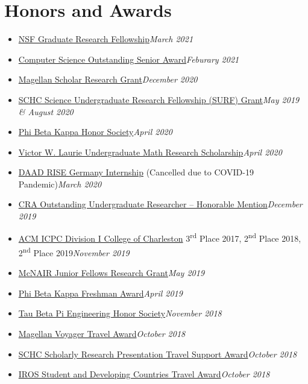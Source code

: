 \documentclass[\ifdefined\cv10pt\else11pt\fi,letterpaper]{moderncv}
\newcommand{\cvonly}[1]{\ifdefined\cv#1\fi\ignorespaces}
\renewcommand{\cvitem}[2]{\item {#1}\hfill\textit{#2}}
\newcommand{\nd}{\textsuperscript{nd}\xspace}
\newcommand{\rd}{\textsuperscript{rd}\xspace}
\let\oldsection\section
\renewcommand{\section}[1]{\vspace*{-1.3ex}\oldsection{#1}\vspace*{-0.5ex}}
\begin{document}
\section{Honors and Awards}
\begin{itemize}
	\cvitem{\href{https://www.research.gov/grfp/Login.do}{NSF Graduate Research Fellowship}}{March 2021}  %
	\cvitem{\href{https://cse.sc.edu/news/outstanding-senior-award-2021}{Computer Science Outstanding Senior Award}}{Feburary 2021}  %
	\cvitem{\href{https://sc.edu/about/offices_and_divisions/undergraduate_research/apply_for_funding/our_funding/magellan-scholar-award/index.php}{Magellan Scholar Research Grant}}{December 2020}
	\cvitem{\href{https://www.sc.edu/study/colleges_schools/honors_college/internal/beyond_the_classroom/undergraduate_research/surf_and_exploration_grants/index.php}{SCHC Science Undergraduate Research Fellowship (SURF) Grant}}{May 2019 \& August 2020}
	\cvitem{\href{https://www.pbk.org/}{Phi Beta Kappa Honor Society}}{April 2020}
	\cvitem{\href{https://sc.edu/study/colleges_schools/artsandsciences/mathematics/study/awards_scholarships/}{Victor W. Laurie Undergraduate Math Research Scholarship}}{April 2020}
	\cvitem{\href{https://www.daad.de/rise/en/rise-germany/}{DAAD RISE Germany Internship} (Cancelled due to COVID-19 Pandemic)}{March 2020}
	\cvitem{\href{https://cra.org/about/awards/outstanding-undergraduate-researcher-award/}{CRA Outstanding Undergraduate Researcher -- Honorable Mention}}{December 2019}  %
	\cvonly{\cvitem{\href{http://compsci.cofc.edu/ACM-ICPC.php}{ACM ICPC Division I College of Charleston} 3\rd Place 2017, 2\nd Place 2018, 2\nd Place 2019}{November 2019}}
	\cvitem{\href{https://sc.edu/about/offices_and_divisions/undergraduate_research/apply_for_funding/other_money_opportunities/cec_mcnair-research-fellows-summer/index.php}{McNAIR Junior Fellows Research Grant}}{May 2019}  %
	\cvitem{\href{https://www.sc.edu/uofsc/announcements/posts/2019/04/university_awards_day_2019.php}{Phi Beta Kappa Freshman Award}}{April 2019}
	\cvitem{\href{https://tbp.org/}{Tau Beta Pi Engineering Honor Society}}{November 2018}
	\cvonly{
	\cvitem{\href{https://www.sc.edu/about/offices_and_divisions/undergraduate_research/apply_for_funding/our_funding/conference-travel/index.php}{Magellan Voyager Travel Award}}{October 2018}
	\cvitem{\href{https://www.sc.edu/study/colleges_schools/honors_college/experience/undergraduate_research/index.php}{SCHC Scholarly Research Presentation Travel Support Award}}{October 2018}
	\cvitem{\href{https://www.iros2018.org/travel-grants}{IROS Student and Developing Countries Travel Award}}{October 2018}
}
\end{itemize}
\end{document}
